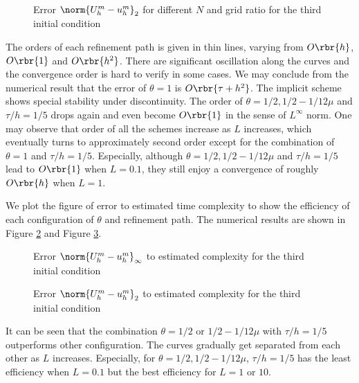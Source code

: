 \documentclass[english, nochinese]{pnote}
\begin{document}
\begin{figure}
\centering
\scalebox{0.75}{}
\caption{Error $ \norm{ U_h^m - u_h^m }_2 $ for different $N$ and grid ratio for the third initial condition}
\label{Fig:Conv23}
\end{figure}

The orders of each refinement path is given in thin lines, varying from $ O \rbr{h} $, $ O \rbr{1} $ and $ O \rbr{h^2} $. There are significant oscillation along the curves and the convergence order is hard to verify in some cases. We may conclude from the numerical result that the error of $ \theta = 1 $ is $ O \rbr{ \tau + h^2 } $. The implicit scheme shows special stability under discontinuity. The order of $ \theta = 1 / 2, 1 / 2 - 1 / 12 \mu $ and $ \tau / h = 1 / 5 $ drops again and even become $ O \rbr{1} $ in the sense of $L^{\infty}$ norm. One may observe that order of all the schemes increase as $L$ increases, which eventually turns to approximately second order except for the combination of $ \theta = 1 $ and $ \tau / h = 1 / 5 $. Especially, although $ \theta = 1 / 2, 1 / 2 - 1 / 12 \mu $ and $ \tau / h = 1 / 5 $ lead to $ O \rbr{1} $ when $ L = 0.1 $, they still enjoy a convergence of roughly $ O \rbr{h} $ when $ L = 1 $.

We plot the figure of error to estimated time complexity to show the efficiency of each configuration of $\theta$ and refinement path. The numerical results are shown in Figure \ref{Fig:EffI3} and Figure \ref{Fig:Eff23}. 

\begin{figure}
\centering
\scalebox{0.75}{}
\caption{Error $ \norm{ U_h^m - u_h^m }_{\infty} $ to estimated complexity for the third initial condition}
\label{Fig:EffI3}
\end{figure}

\begin{figure}
\centering
\scalebox{0.75}{}
\caption{Error $ \norm{ U_h^m - u_h^m }_2 $ to estimated complexity for the third initial condition}
\label{Fig:Eff23}
\end{figure}

It can be seen that the combination $ \theta = 1 / 2 $ or $ 1 / 2 - 1 / 12 \mu $ with $ \tau / h = 1 / 5 $ outperforms other configuration. The curves gradually get separated from each other as $L$ increases. Especially, for $ \theta = 1 / 2, 1 / 2 - 1 / 12 \mu $, $ \tau / h = 1 / 5 $ has the least efficiency when $ L = 0.1 $ but the best efficiency for $ L = 1 $ or $10$.
\end{document}
